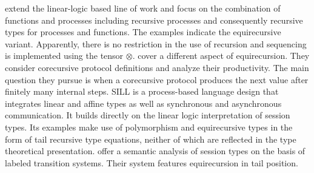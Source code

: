\citet{DBLP:conf/esop/ToninhoCP13} extend the linear-logic based line
of work and focus on the combination of functions and processes
including recursive processes and consequently recursive
types for processes and functions. The examples indicate the equirecursive variant.
Apparently, there is no restriction in the use of recursion and
sequencing is implemented using the tensor $\otimes$.
%
\citet{DBLP:conf/tgc/ToninhoCP14} cover a different aspect of
equirecursion. They consider corecursive protocol definitions and
analyze their productivity. The main question they pursue is when a
corecursive protocol produces the next value after finitely many
internal steps.
%
SILL \cite{DBLP:conf/fossacs/PfenningG15} is a process-based language design that
integrates linear and affine types as well as synchronous and
asynchronous communication. It builds directly on the linear logic interpretation of session
types. Its examples make use of polymorphism and equirecursive types in the form of tail
recursive type equations, neither of which are reflected in the type
theoretical presentation.
%
\citet{DBLP:conf/concur/BartolettiSZ14} offer a semantic analysis of
session types on the basis of labeled transition systems. Their
system features equirecursion in tail position.



